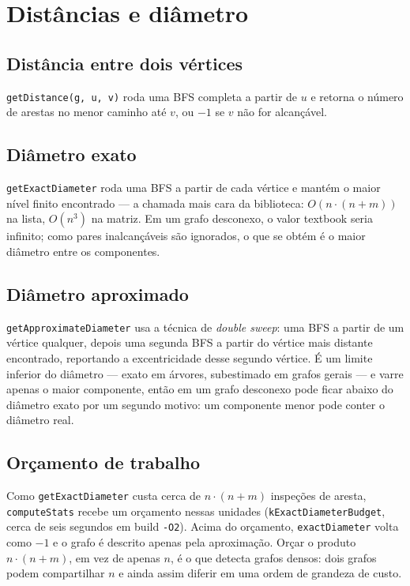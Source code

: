 \documentclass[a4paper,11pt]{article}
\begin{document}
\section{Distâncias e diâmetro}

\subsection{Distância entre dois vértices}

\texttt{getDistance(g, u, v)} roda uma BFS completa a partir de \(u\) e
retorna o número de arestas no menor caminho até \(v\), ou $-1$ se $v$
não for alcançável.

\subsection{Diâmetro exato}

\texttt{getExactDiameter} roda uma BFS a partir de cada vértice e mantém o
maior nível finito encontrado --- a chamada mais cara da biblioteca:
$O(n \cdot (n+m))$ na lista, $O(n^3)$ na matriz. Em um grafo desconexo, o
valor textbook seria infinito; como pares inalcançáveis são ignorados,
o que se obtém é o maior diâmetro entre os componentes.

\subsection{Diâmetro aproximado}

\texttt{getApproximateDiameter} usa a técnica de \emph{double sweep}: uma
BFS a partir de um vértice qualquer, depois uma segunda BFS a partir do
vértice mais distante encontrado, reportando a excentricidade desse
segundo vértice. É um limite inferior do diâmetro --- exato em árvores,
subestimado em grafos gerais --- e varre apenas o maior componente, então
em um grafo desconexo pode ficar abaixo do diâmetro exato por um segundo
motivo: um componente menor pode conter o diâmetro real.

\subsection{Orçamento de trabalho}

Como \texttt{getExactDiameter} custa cerca de $n \cdot (n+m)$ inspeções de
aresta, \texttt{computeStats} recebe um orçamento nessas unidades
(\texttt{kExactDiameterBudget}, cerca de seis segundos em build \texttt{-O2}).
Acima do orçamento, \texttt{exactDiameter} volta como $-1$ e o grafo é
descrito apenas pela aproximação. Orçar o produto $n\cdot(n+m)$, em vez de
apenas $n$, é o que detecta grafos densos: dois grafos podem compartilhar
$n$ e ainda assim diferir em uma ordem de grandeza de custo.
\end{document}
